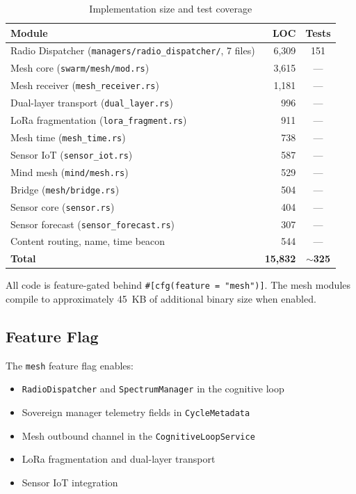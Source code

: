 \documentclass[11pt,twocolumn]{article}
\begin{document}
\begin{table}[H]
\centering
\caption{Implementation size and test coverage}
\label{tab:implementation}
\scriptsize
\begin{tabular}{@{}lrc@{}}
\toprule
\textbf{Module} & \textbf{LOC} & \textbf{Tests} \\
\midrule
Radio Dispatcher (\texttt{managers/radio\_dispatcher/}, 7 files) & 6,309 & 151 \\
Mesh core (\texttt{swarm/mesh/mod.rs}) & 3,615 & --- \\
Mesh receiver (\texttt{mesh\_receiver.rs}) & 1,181 & --- \\
Dual-layer transport (\texttt{dual\_layer.rs}) & 996 & --- \\
LoRa fragmentation (\texttt{lora\_fragment.rs}) & 911 & --- \\
Mesh time (\texttt{mesh\_time.rs}) & 738 & --- \\
Sensor IoT (\texttt{sensor\_iot.rs}) & 587 & --- \\
Mind mesh (\texttt{mind/mesh.rs}) & 529 & --- \\
Bridge (\texttt{mesh/bridge.rs}) & 504 & --- \\
Sensor core (\texttt{sensor.rs}) & 404 & --- \\
Sensor forecast (\texttt{sensor\_forecast.rs}) & 307 & --- \\
Content routing, name, time beacon & 544 & --- \\
\midrule
\textbf{Total} & \textbf{15,832} & \textbf{$\sim$325} \\
\bottomrule
\end{tabular}
\end{table}

All code is feature-gated behind \texttt{\#[cfg(feature = "mesh")]}.
The mesh modules compile to approximately 45~KB of additional binary
size when enabled.

\subsection{Feature Flag}

The \texttt{mesh} feature flag enables:
\begin{itemize}[nosep]
  \item \texttt{RadioDispatcher} and \texttt{SpectrumManager} in the
    cognitive loop
  \item Sovereign manager telemetry fields in \texttt{CycleMetadata}
  \item Mesh outbound channel in the \texttt{CognitiveLoopService}
  \item LoRa fragmentation and dual-layer transport
  \item Sensor IoT integration
\end{itemize}
\end{document}
